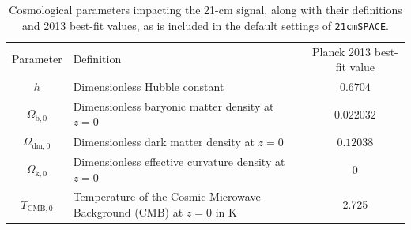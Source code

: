 \documentclass[floats,floatfix,showpacs,amssymb,prd,superscriptaddress,nofootinbib]{revtex4-2} %
\newcommand{\code}{\texttt}
\begin{document}
\begin{table}
    \centering
    \begin{tabular}{|c|l|c|}
        \hline
        Parameter & Definition & Planck 2013 best-fit value\\ \hhline{|=|=|=|}
        $h$ & Dimensionless Hubble constant & $0.6704$\\ \hline
        $\Omega_{\text{b}, 0}$ & Dimensionless baryonic matter density at $z = 0$ & $0.022032$\\ \hline
        $\Omega_{\text{dm}, 0}$ & Dimensionless dark matter density at $z = 0$ & $0.12038$\\ \hline
        $\Omega_{\text{k}, 0}$ & Dimensionless effective curvature density at $z = 0$ & $0$\\ \hline
        $T_{\text{CMB},0}$ & Temperature of the Cosmic Microwave Background (CMB) at $z = 0$ in K & 2.725\\ \hline
    \end{tabular}
    \caption{Cosmological parameters impacting the 21-cm signal, along with their definitions and 2013 best-fit values, as is included in the default settings of \code{21cmSPACE}.}
    \label{tab:cosmological_parameters}
\end{table}



\end{document}
